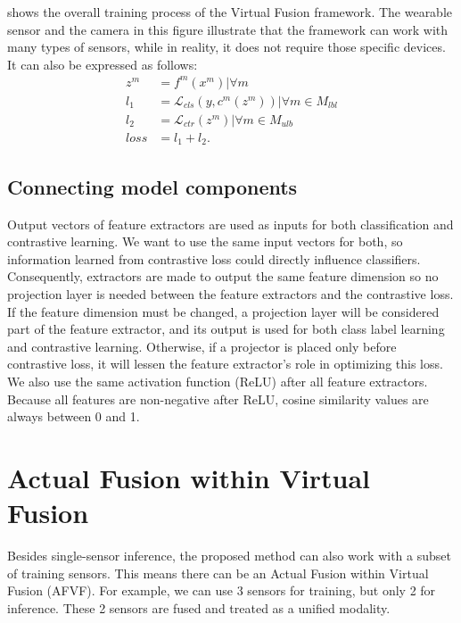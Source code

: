 \documentclass[conference]{IEEEtran}
\begin{document}
 shows the overall training process of the Virtual Fusion framework. The wearable sensor and the camera in this figure illustrate that the framework can work with many types of sensors, while in reality, it does not require those specific devices. It can also be expressed as follows:
\begin{equation}
\begin{aligned}
z^m &= f^m(x^m) | \forall m \\
l_{1} &= \mathcal{L}_{cls}(y, c^m(z^m)) | \forall m \in M_{lbl}\\
l_{2} &= \mathcal{L}_{ctr}(z^m) | \forall m \in M_{ulb} \\
loss &= l_1 + l_2.
\end{aligned}
\end{equation}

\subsection{Connecting model components}
\label{subsec: connect components}
Output vectors of feature extractors are used as inputs for both classification and contrastive learning. We want to use the same input vectors for both, so information learned from contrastive loss could directly influence classifiers. Consequently, extractors are made to output the same feature dimension so no projection layer is needed between the feature extractors and the contrastive loss. If the feature dimension must be changed, a projection layer will be considered part of the feature extractor, and its output is used for both class label learning and contrastive learning. Otherwise, if a projector is placed only before contrastive loss, it will lessen the feature extractor's role in optimizing this loss. We also use the same activation function (ReLU) after all feature extractors. Because all features are non-negative after ReLU, cosine similarity values are always between 0 and 1. 

\section{Actual Fusion within Virtual Fusion}
\label{sec: afvf}
Besides single-sensor inference, the proposed method can also work with a subset of training sensors. This means there can be an Actual Fusion within Virtual Fusion (AFVF). For example, we can use 3 sensors for training, but only 2 for inference. These 2 sensors are fused and treated as a unified modality.
\end{document}
